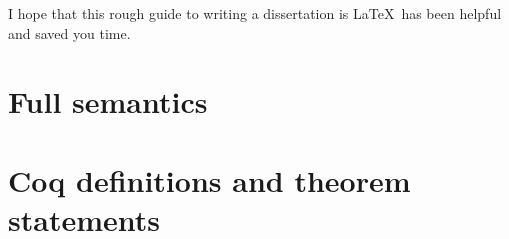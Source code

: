 \documentclass[12pt,twoside,notitlepage]{report}
\theoremstyle{plain}%
\theoremstyle{definition}
\theoremstyle{remark}
\begin{document}
I hope that this rough guide to writing a dissertation is \LaTeX\ has
been helpful and saved you time.




\cleardoublepage



\cleardoublepage

\appendix

\chapter{Full semantics}
\ottall
\label{chap:fullsemantics}









\chapter{Coq definitions and theorem statements}
\label{cha:full_proof_statements}
\end{document}
